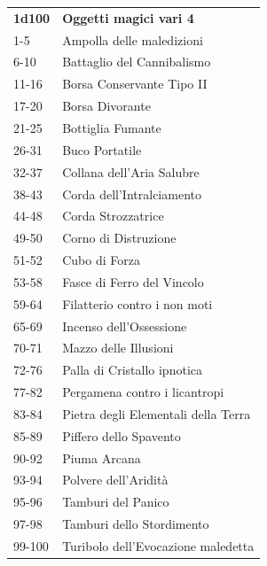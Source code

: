 \begin{multicols}{2}
	\begin{tabularx}{0.45\textwidth}{lX}
		\textbf{1d100} & \textbf{Oggetti magici vari 4}\\
		1-5 &Ampolla delle maledizioni\\
		6-10 &Battaglio del Cannibalismo\\
		11-16& Borsa Conservante Tipo II\\
		17-20& Borsa Divorante\\
		21-25& Bottiglia Fumante\\
		26-31& Buco Portatile\\
		32-37& Collana dell’Aria Salubre\\
		38-43& Corda dell'Intralciamento\\
		44-48& Corda Strozzatrice\\
		49-50& Corno di Distruzione\\
		51-52& Cubo di Forza\\
		53-58& Fasce di Ferro del Vincolo\\
		59-64& Filatterio contro i non moti\\
		65-69& Incenso dell’Ossessione\\
		70-71& Mazzo delle Illusioni\\
		72-76& Palla di Cristallo ipnotica\\
		77-82& Pergamena contro i licantropi\\
		83-84& Pietra degli Elementali della Terra\\
		85-89& Piffero dello Spavento\\
		90-92& Piuma Arcana\\
		93-94& Polvere dell'Aridità\\
		95-96& Tamburi del Panico\\
		97-98& Tamburi dello Stordimento\\
		99-100& Turibolo dell’Evocazione maledetta\\
	\end{tabularx}



\end{multicols}
